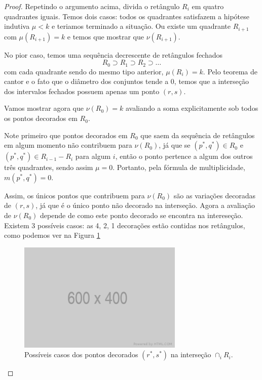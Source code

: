 \begin{proof}
Repetindo o argumento acima, divida o retângulo $R_i$ em quatro quadrantes iguais. Temos dois
casos: todos os quadrantes satisfazem a hipótese indutiva $\mu<k$ e teriamos terminado a situação.
Ou existe um quadrante $R_{i+1}$ com $\mu(R_{i+1})=k$ e temos que mostrar que $\nu(R_{i+1})$.

No pior caso, temos uma sequência decrescente de retângulos fechados
\begin{equation*}
    R_0 \supset R_1 \supset R_2 \supset \dots
\end{equation*}
com cada quadrante sendo do mesmo tipo anterior, $\mu(R_i) = k$. Pelo teorema de cantor e o fato
que o diâmetro dos conjuntos tende a $0$, temos que a interseção dos intervalos fechados possuem
apenas um ponto $(r,s)$.

Vamos mostrar agora que $\nu(R_0) = k$ avaliando a soma explicitamente sob todos os pontos decorados
em $R_0$.

Note primeiro que pontos decorados em $R_0$ que saem da sequência de retângulos em algum momento não
contribuem para $\nu(R_0)$, já que se $(p^*, q^*) \in R_0$ e $(p^*, q^*) \in R_{i-1} - R_i$ para 
algum $i$, então o ponto pertence a algum dos outros três quadrantes, sendo assim $\mu = 0$. 
Portanto, pela fórmula de multiplicidade, $m(p^*, q^*) = 0$. 

Assim, os únicos pontos que contribuem para $\nu(R_0)$ são as variações decoradas de $(r,s)$, já 
que é o único ponto não decorado na interseção. Agora a avaliação de $\nu(R_0)$ depende de como 
este ponto decorado se encontra na intereseção. Existem 3 possíveis casos: as 4, 2, 1 decorações
estão contidas nos retângulos, como podemos ver na Figura \ref{fig:proof_rect}

\begin{figure}[htpb!]
    \centering
    \includegraphics[width=0.7\textwidth]{images/placeholder.png}
    \caption{Possíveis casos dos pontos decorados $(r^*, s^*)$ na interseção $\cap_i R_i$.}
    \label{fig:proof_rect}
\end{figure}


\end{proof}
